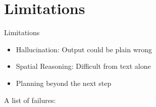 \section{Limitations}

\begin{frame}[c]{Limitations} 
    \large
    \begin{itemize}[<+(1)->]
        \item Hallucination: Output could be plain wrong
        \item Spatial Reasoning: Difficult from text alone
        \item Planning beyond the next step
    \end{itemize}
    A list of failures: \cite{borji_categorical_2023}
\end{frame}

% 
% 
% 

